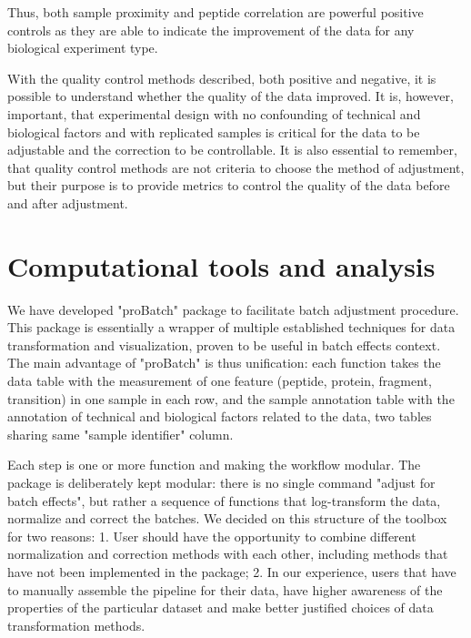 \documentclass[num-refs]{wiley-article}
\begin{document}
Thus, both sample proximity and peptide correlation are powerful positive controls as they are able to indicate the improvement of the data for any biological experiment type.

With the quality control methods described, both positive and negative, it is possible to understand whether the quality of the data improved. It is, however, important, that experimental design with no confounding of technical and biological factors and with replicated samples is critical for the data to be adjustable and the correction to be controllable. It is also essential to remember, that quality control methods are not criteria to choose the method of adjustment, but their purpose is to provide metrics to control the quality of the data before and after adjustment.

\section{Computational tools and analysis}
We have developed "proBatch" package to facilitate batch adjustment procedure. This package is essentially a wrapper of multiple established techniques for data transformation and visualization, proven to be useful in batch effects context. The main advantage of "proBatch" is thus unification: each function takes the data table with the measurement of one feature (peptide, protein, fragment, transition) in one sample in each row, and the sample annotation table with the annotation of technical and biological factors related to the data, two tables sharing same "sample identifier" column. 

Each step is one or more function and making the workflow modular. The package is deliberately kept modular: there is no single command "adjust for batch effects", but rather a sequence of functions that log-transform the data, normalize and correct the batches. We decided on this structure of the toolbox for two reasons: 1. User should have the opportunity to combine different normalization and correction methods with each other, including methods that have not been implemented in the package; 2. In our experience, users that have to manually assemble the pipeline for their data, have higher awareness of the properties of the particular dataset and make better justified choices of data transformation methods.
\end{document}
